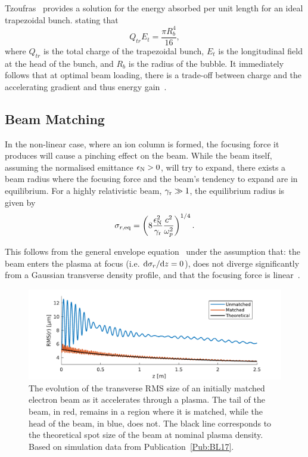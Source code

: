 Tzoufras \etal ~provides a solution for the energy absorbed per unit length for an ideal trapezoidal bunch. stating that
\begin{equation}
    Q_{tr}E_{t} = \frac{\pi R_{b}^{4}}{16}, \label{EQ:Trapez}
\end{equation}
where $Q_{tr}$ is the total charge of the trapezoidal bunch, $E_{t}$ is the longitudinal field at the head of the bunch, and $R_{b}$ is the radius of the bubble. It immediately follows that at optimal beam loading, there is a trade-off between charge and the accelerating gradient and thus energy gain~\cite{tzoufras:2009}.

\subsection{Beam Matching}
\label{Int:BPI:Match}

In the non-linear case, where an ion column is formed, the focusing force it produces will cause a pinching effect on the beam. While the beam itself, assuming the normalised emittance $\epsilon_{\mathrm{N}} > 0$, will try to expand, there exists a beam radius where the focusing force and the beam's tendency to expand are in equilibrium. For a highly relativistic beam, $\gamma_{\mathrm{r}} \gg 1$, the equilibrium radius is given by~\cite{krall:1995}
\begin{equation}
    \sigma_{r,\mathrm{eq}} = \left( 8 \frac{\epsilon_{\mathrm{N}}^2}{\gamma_{\mathrm{r}}} \frac{c^2}{\omega_{p}^2} \right)^{1/4}. \label{EQ:BMatch}
\end{equation}

This follows from the general envelope equation~\cite{lee:1976} under the assumption that: the beam enters the plasma at focus (i.e. $\mathrm{d}\sigma_{r}/\mathrm{d} z = 0$), does not diverge significantly from a Gaussian transverse density profile, and that the focusing force is linear~\cite{krall:1995}.

\begin{figure}[hbt]
    \centering
    \includegraphics[width=0.875\linewidth,trim={0mm 0mm 0mm 0mm},clip]{figures/BeamMatching}
    \caption{\label{Fig:BPI:Match} The evolution of the transverse RMS size of an initially matched electron beam as it accelerates through a plasma. The tail of the beam, in red, remains in a region where it is matched, while the head of the beam, in blue, does not. The black line corresponds to the theoretical spot size of the beam at nominal plasma density. Based on simulation data from Publication~\ref{Pub:BL17}.}
\end{figure}

